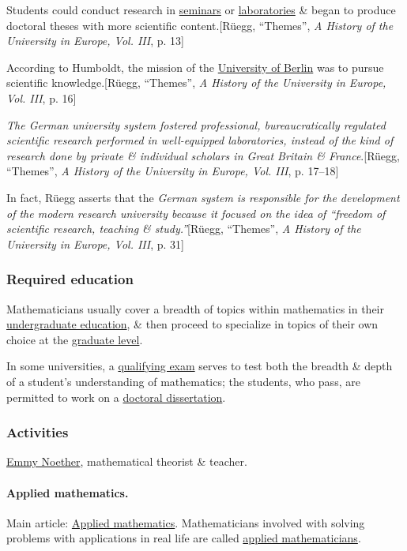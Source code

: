 \documentclass{article}
\begin{document}
Students could conduct research in \href{https://en.wikipedia.org/wiki/Seminars}{seminars} or \href{https://en.wikipedia.org/wiki/Laboratories}{laboratories} \& began to produce doctoral theses with more scientific content.[Rüegg, ``Themes'', \textit{A History of the University in Europe, Vol. III}, p. 13]

According to Humboldt, the mission of the \href{https://en.wikipedia.org/wiki/University_of_Berlin}{University of Berlin} was to pursue scientific knowledge.[Rüegg, ``Themes'', \textit{A History of the University in Europe, Vol. III}, p. 16]

\textit{The German university system fostered professional, bureaucratically regulated scientific research performed in well-equipped laboratories, instead of the kind of research done by private \& individual scholars in Great Britain \& France}.[Rüegg, ``Themes'', \textit{A History of the University in Europe, Vol. III}, p. 17--18]

In fact, Rüegg asserts that the \textit{German system is responsible for the development of the modern research university because it focused on the idea of ``freedom of scientific research, teaching \& study.''}[Rüegg, ``Themes'', \textit{A History of the University in Europe, Vol. III}, p. 31]

\subsubsection{Required education}
Mathematicians usually cover a breadth of topics within mathematics in their \href{https://en.wikipedia.org/wiki/Undergraduate_education}{undergraduate education}, \& then proceed to specialize in topics of their own choice at the \href{https://en.wikipedia.org/wiki/Graduate-level}{graduate level}.

In some universities, a \href{https://en.wikipedia.org/wiki/Qualifying_exam}{qualifying exam} serves to test both the breadth \& depth of a student's understanding of mathematics; the students, who pass, are permitted to work on a \href{https://en.wikipedia.org/wiki/Doctoral_dissertation}{doctoral dissertation}.

\subsubsection{Activities}
\textsf{\href{https://en.wikipedia.org/wiki/Emmy_Noether}{Emmy Noether}, mathematical theorist \& teacher.}

\paragraph{Applied mathematics.} Main article: \href{https://en.wikipedia.org/wiki/Applied_mathematics}{Applied mathematics}. Mathematicians involved with solving problems with applications in real life are called \href{https://en.wikipedia.org/wiki/Applied_mathematician}{applied mathematicians}.
\end{document}
